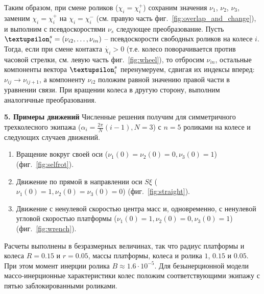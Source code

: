 Таким образом, при смене роликов ($\chi_i = \chi_i^+$) сохраним значения $\nu_1$, $\nu_2$, $\nu_3$, заменим $\chi_i = \chi_i^+$ на $\chi_i = \chi_i^-$ (см. правую часть фиг.~\ref{fig:overlap_and_change}), и выполним с псевдоскоростями $\nu_s$ следующее преобразование. Пусть $\vnu_i^s = (\nu_{i2},\ldots,\nu_{in})$ -- псевдоскорости свободных роликов на колесе $i$. Тогда, если при смене контакта $\dot{\chi_i} > 0$ (т.е. колесо поворачивается против часовой стрелки, см. левую часть фиг.~\ref{fig:wheel}), то отбросим $\nu_{in}$, остальные компоненты вектора $\vnu_i^s$ перенумеруем, сдвигая их индексы вперед: $\nu_{ij} \rightarrow \nu_{ij+1}$, а компоненту $\nu_{i2}$ положим равной значению правой части в уравнении связи. При вращении колеса в другую сторону, выполним аналогичные преобразования.



{\bf 5. Примеры движений}
Численные решения получим для симметричного трехколесного экипажа ($\alpha_i = \frac{2\pi}{N}(i - 1), N = 3$) с $n = 5$ роликами на колесе и следующих случаев движений.
\begin{enumerate}[wide]
    \item
    \label{sol:selfrot} Вращение вокруг своей оси ($\nu_1(0) = \nu_2(0) = 0, \nu_3(0) = 1$) (фиг.~\ref{fig:selfrot}).
    \item
    \label{sol:straight} Движение по прямой в направлении оси $S\xi$ ($\nu_1(0) = 1, \nu_2(0) = \nu_3(0) = 0$) (фиг.~\ref{fig:straight}).
    \item
    \label{sol:wrench} Движение с ненулевой скоростью центра масс и, одновременно, с ненулевой угловой скоростью платформы ($\nu_1(0) = 1, \nu_2(0) = 0, \nu_3(0) = 1$) (фиг.~\ref{fig:wrench}).

\end{enumerate}


Расчеты выполнены в безразмерных величинах, так что радиус платформы и колеса $R = 0.15$ и $r = 0.05$, массы платформы, колеса и ролика $1$, $0.15$ и $0.05$. При этом момент инерции ролика $B \approx 1.6 \cdot 10^{-5}$. Для безынерционной модели массо-инерционные характеристики колес положим соответствующими экипажу с пятью заблокированными роликами.

